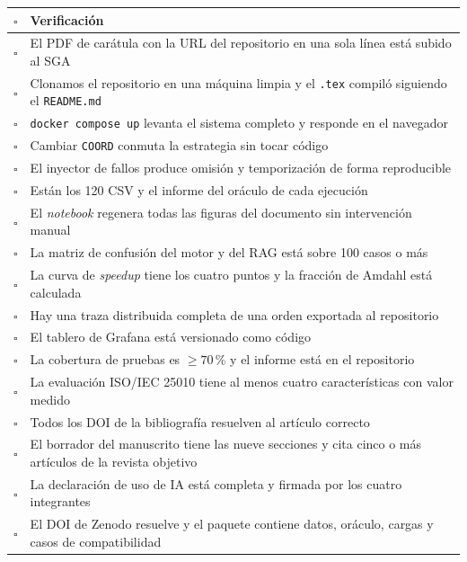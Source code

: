 \documentclass[11pt,a4paper]{article}
\begin{document}
\begin{center}
	\small
	\begin{tabular}{@{}p{0.7cm}p{14.3cm}@{}}
		\toprule
		\textbf{$\square$} & \textbf{Verificación} \\
		\midrule
		$\square$ & El PDF de carátula con la URL del repositorio en una sola línea está subido al SGA \\
		$\square$ & Clonamos el repositorio en una máquina limpia y el \texttt{.tex} compiló siguiendo el \texttt{README.md} \\
		$\square$ & \texttt{docker compose up} levanta el sistema completo y responde en el navegador \\
		$\square$ & Cambiar \texttt{COORD} conmuta la estrategia sin tocar código \\
		$\square$ & El inyector de fallos produce omisión y temporización de forma reproducible \\
		$\square$ & Están los 120 CSV y el informe del oráculo de cada ejecución \\
		$\square$ & El \emph{notebook} regenera todas las figuras del documento sin intervención manual \\
		$\square$ & La matriz de confusión del motor y del RAG está sobre 100 casos o más \\
		$\square$ & La curva de \emph{speedup} tiene los cuatro puntos y la fracción de Amdahl está calculada \\
		$\square$ & Hay una traza distribuida completa de una orden exportada al repositorio \\
		$\square$ & El tablero de Grafana está versionado como código \\
		$\square$ & La cobertura de pruebas es $\geq 70\,\%$ y el informe está en el repositorio \\
		$\square$ & La evaluación ISO/IEC 25010 tiene al menos cuatro características con valor medido \\
		$\square$ & Todos los DOI de la bibliografía resuelven al artículo correcto \\
		$\square$ & El borrador del manuscrito tiene las nueve secciones y cita cinco o más artículos de la revista objetivo \\
		$\square$ & La declaración de uso de IA está completa y firmada por los cuatro integrantes \\
		$\square$ & El DOI de Zenodo resuelve y el paquete contiene datos, oráculo, cargas y casos de compatibilidad \\
		\bottomrule
	\end{tabular}
\end{center}
\end{document}
